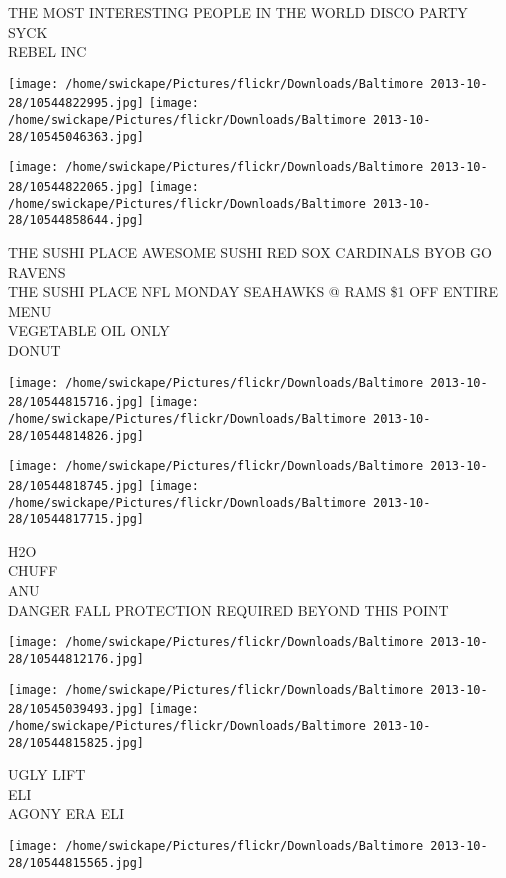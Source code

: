 \documentclass[10pt,letterpaper]{article}
\begin{document}
THE MOST INTERESTING PEOPLE IN THE WORLD DISCO PARTY\\
SYCK\\
REBEL INC
\pagebreak

\texttt{[image: /home/swickape/Pictures/flickr/Downloads/Baltimore 2013-10-28/10544822995.jpg]}
\texttt{[image: /home/swickape/Pictures/flickr/Downloads/Baltimore 2013-10-28/10545046363.jpg]}

\texttt{[image: /home/swickape/Pictures/flickr/Downloads/Baltimore 2013-10-28/10544822065.jpg]}
\texttt{[image: /home/swickape/Pictures/flickr/Downloads/Baltimore 2013-10-28/10544858644.jpg]}

THE SUSHI PLACE AWESOME SUSHI RED SOX CARDINALS BYOB GO RAVENS\\
THE SUSHI PLACE NFL MONDAY SEAHAWKS @ RAMS \$1 OFF ENTIRE MENU\\
VEGETABLE OIL ONLY\\
DONUT
\pagebreak

\texttt{[image: /home/swickape/Pictures/flickr/Downloads/Baltimore 2013-10-28/10544815716.jpg]}
\texttt{[image: /home/swickape/Pictures/flickr/Downloads/Baltimore 2013-10-28/10544814826.jpg]}

\texttt{[image: /home/swickape/Pictures/flickr/Downloads/Baltimore 2013-10-28/10544818745.jpg]}
\texttt{[image: /home/swickape/Pictures/flickr/Downloads/Baltimore 2013-10-28/10544817715.jpg]}

H2O\\
CHUFF\\
ANU\\
DANGER FALL PROTECTION REQUIRED BEYOND THIS POINT
\pagebreak

\texttt{[image: /home/swickape/Pictures/flickr/Downloads/Baltimore 2013-10-28/10544812176.jpg]}

\vspace{0.25in}
\texttt{[image: /home/swickape/Pictures/flickr/Downloads/Baltimore 2013-10-28/10545039493.jpg]}
\texttt{[image: /home/swickape/Pictures/flickr/Downloads/Baltimore 2013-10-28/10544815825.jpg]}

UGLY LIFT\\
ELI\\
AGONY ERA ELI
\pagebreak

\texttt{[image: /home/swickape/Pictures/flickr/Downloads/Baltimore 2013-10-28/10544815565.jpg]}
\end{document}

